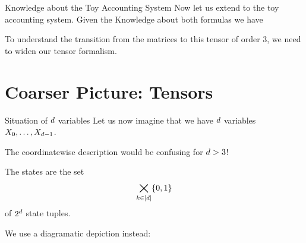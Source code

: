 \documentclass{beamer}
\begin{document}
    \begin{frame}{Knowledge about the Toy Accounting System}
        Now let us extend to the toy accounting system.
        Given the Knowledge about both formulas we have
        \begin{center}
        \end{center}

        To understand the transition from the matrices to this tensor of order $3$, we need to widen our tensor formalism.

    \end{frame}


    \section{Coarser Picture: Tensors}

    \begin{frame}{Situation of $d$ variables}
        Let us now imagine that we have $d$ variables $X_{0},\ldots,X_{d-1}$.

        The coordinatewise description would be confusing for $d>3$!

        The states are the set
        \begin{align*}
            \bigtimes_{k\in[d]} \{0,1\}
        \end{align*}
        of $2^{d}$ state tuples.

        We use a diagramatic depiction instead:


    \end{frame}
\end{document}
